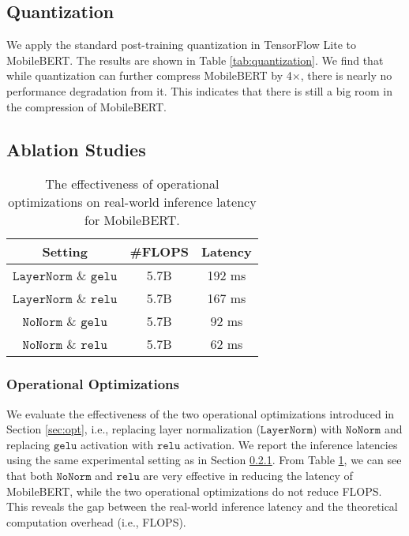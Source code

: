 \documentclass[11pt,a4paper]{article}
\begin{document}
\subsection{Quantization}

We apply the standard post-training quantization in TensorFlow Lite to MobileBERT. The results are shown in Table \ref{tab:quantization}. We find that while quantization can further compress MobileBERT by 4$\times$, there is nearly no performance degradation from it. This indicates that there is still a big room in the compression of MobileBERT.

\subsection{Ablation Studies}


\begin{table}[t]
	\begin{center}
	    \small
		\begin{tabular}{ c  c  c }
		    \hline
		    \textbf{Setting} & \textbf{\#FLOPS} & \textbf{Latency}\\
			\hline
             $\mathtt{LayerNorm}$ \& $\mathtt{gelu}$ & 5.7B & 192 ms\\
             $\mathtt{LayerNorm}$ \& $\mathtt{relu}$ & 5.7B & 167 ms\\
             $\mathtt{NoNorm}$ \& $\mathtt{gelu}$ & 5.7B & 92 ms\\
             $\mathtt{NoNorm}$ \& $\mathtt{relu}$ & 5.7B & 62 ms\\
            \hline
		\end{tabular}
	\end{center}
	\caption{The effectiveness of operational optimizations on real-world inference latency for MobileBERT.}
	\label{tab:latency}
\end{table}


\subsubsection{Operational Optimizations}\label{app:latency}

 We evaluate the effectiveness of the two operational optimizations introduced in Section \ref{sec:opt}, i.e., replacing layer normalization ($\mathtt{LayerNorm}$) with $\mathtt{NoNorm}$ and replacing $\mathtt{gelu}$ activation with $\mathtt{relu}$ activation. We report the inference latencies using the same experimental setting as in Section \ref{app:latency}. From Table \ref{tab:latency}, we can see that both $\mathtt{NoNorm}$ and $\mathtt{relu}$ are very effective in reducing the latency of MobileBERT, while the two operational optimizations do not reduce FLOPS. This reveals the gap between the real-world inference latency and the theoretical computation overhead (i.e., FLOPS).
\end{document}
